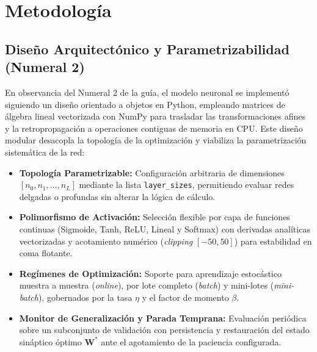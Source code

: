 \documentclass[11pt,letterpaper]{article}
\begin{document}
\section{Metodología}
\label{sec:metodologia}

\subsection{Diseño Arquitectónico y Parametrizabilidad (Numeral 2)}

En observancia del Numeral 2 de la guía, el modelo neuronal se implementó siguiendo un diseño orientado a objetos en Python, empleando matrices de álgebra lineal vectorizada con NumPy para trasladar las transformaciones afines y la retropropagación a operaciones contiguas de memoria en CPU. Este diseño modular desacopla la topología de la optimización y viabiliza la parametrización sistemática de la red:
\begin{itemize}
    \item \textbf{Topología Parametrizable:} Configuración arbitraria de dimensiones $[n_0, n_1, \dots, n_L]$ mediante la lista \texttt{layer\_sizes}, permitiendo evaluar redes delgadas o profundas sin alterar la lógica de cálculo.
    \item \textbf{Polimorfismo de Activación:} Selección flexible por capa de funciones continuas (Sigmoide, Tanh, ReLU, Lineal y Softmax) con derivadas analíticas vectorizadas y acotamiento numérico (\textit{clipping} $[-50, 50]$) para estabilidad en coma flotante.
    \item \textbf{Regímenes de Optimización:} Soporte para aprendizaje estocástico muestra a muestra (\textit{online}), por lote completo (\textit{batch}) y mini-lotes (\textit{mini-batch}), gobernados por la tasa $\eta$ y el factor de momento $\beta$.
    \item \textbf{Monitor de Generalización y Parada Temprana:} Evaluación periódica sobre un subconjunto de validación con persistencia y restauración del estado sináptico óptimo $\mathbf{W}^*$ ante el agotamiento de la paciencia configurada.
\end{itemize}
\end{document}
